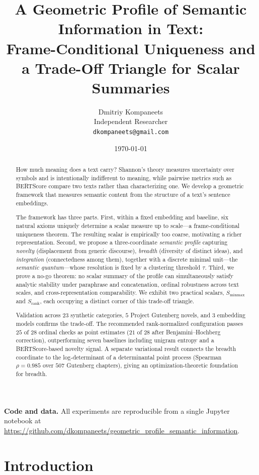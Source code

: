 \documentclass[11pt]{article}
\title{A Geometric Profile of Semantic Information in Text:\\
       Frame-Conditional Uniqueness and a Trade-Off Triangle for Scalar Summaries}
\author{Dmitriy Kompaneets\\Independent Researcher\\
        \texttt{dkompaneets@gmail.com}}
\date{\today}
\begin{document}
\maketitle

\begin{abstract}
How much meaning does a text carry? Shannon's theory measures uncertainty over symbols and is intentionally indifferent to meaning, while pairwise metrics such as BERTScore compare two texts rather than characterizing one. We develop a geometric framework that measures semantic content from the structure of a text's sentence embeddings.

The framework has three parts. First, within a fixed embedding and baseline, six natural axioms uniquely determine a scalar measure up to scale---a frame-conditional uniqueness theorem. The resulting scalar is empirically too coarse, motivating a richer representation. Second, we propose a three-coordinate \emph{semantic profile} capturing \emph{novelty} (displacement from generic discourse), \emph{breadth} (diversity of distinct ideas), and \emph{integration} (connectedness among them), together with a discrete minimal unit---the \emph{semantic quantum}---whose resolution is fixed by a clustering threshold $\tau$. Third, we prove a no-go theorem: no scalar summary of the profile can simultaneously satisfy analytic stability under paraphrase and concatenation, ordinal robustness across text scales, and cross-representation comparability. We exhibit two practical scalars, $S_{\mathrm{minmax}}$ and $S_{\mathrm{rank}}$, each occupying a distinct corner of this trade-off triangle.

Validation across $23$ synthetic categories, $5$ Project Gutenberg novels, and $3$ embedding models confirms the trade-off. The recommended rank-normalized configuration passes $25$ of $28$ ordinal checks as point estimates ($21$ of $28$ after Benjamini--Hochberg correction), outperforming seven baselines including unigram entropy and a BERTScore-based novelty signal. A separate variational result connects the breadth coordinate to the log-determinant of a determinantal point process (Spearman $\rho = 0.985$ over $507$ Gutenberg chapters), giving an optimization-theoretic foundation for breadth.
\end{abstract}

\noindent\textbf{Code and data.} All experiments are reproducible from a single Jupyter notebook at \url{https://github.com/dkompaneets/geometric_profile_semantic_information}.

\section{Introduction}
\end{document}
